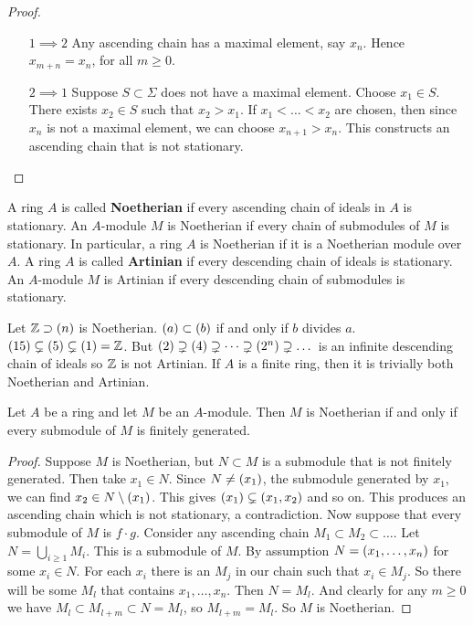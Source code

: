 \begin{proof}
\hfill
\begin{itemize}[leftmargin=0.5in]
\item[$ 1 \implies 2 $] Any ascending chain has a maximal element, say $ x_n $. Hence $ x_{m + n} = x_n $, for all $ m \ge 0 $.
\item[$ 2 \implies 1 $] Suppose $ S \subset \Sigma $ does not have a maximal element. Choose $ x_1 \in S $. There exists $ x_2 \in S $ such that $ x_2 > x_1 $. If $ x_1 < \dots < x_2 $ are chosen, then since $ x_n $ is not a maximal element, we can choose $ x_{n + 1} > x_n $. This constructs an ascending chain that is not stationary.
\end{itemize}
\end{proof}

\begin{definition}
A ring $ A $ is called \textbf{Noetherian} if every ascending chain of ideals in $ A $ is stationary. An $ A $-module $ M $ is Noetherian if every chain of submodules of $ M $ is stationary. In particular, a ring $ A $ is Noetherian if it is a Noetherian module over $ A $. A ring $ A $ is called \textbf{Artinian} if every descending chain of ideals is stationary. An $ A $-module $ M $ is Artinian if every descending chain of submodules is stationary.
\end{definition}

\begin{example*}
Let $ \mathbb{Z} \supset \left( n \right) $ is Noetherian. $ \left( a \right) \subset \left( b \right) $ if and only if $ b $ divides $ a $. $ \left( 15 \right) \subsetneq \left( 5 \right) \subsetneq \left( 1 \right) = \mathbb{Z} $. But $ \left( 2 \right) \supsetneq \left( 4 \right) \supsetneq \dots \supsetneq \left( 2^n \right) \supsetneq \dots $ is an infinite descending chain of ideals so $ \mathbb{Z} $ is not Artinian. If $ A $ is a finite ring, then it is trivially both Noetherian and Artinian.
\end{example*}

\begin{proposition}
Let $ A $ be a ring and let $ M $ be an $ A $-module. Then $ M $ is Noetherian if and only if every submodule of $ M $ is finitely generated.
\end{proposition}

\begin{proof}
Suppose $ M $ is Noetherian, but $ N \subset M $ is a submodule that is not finitely generated. Then take $ x_1 \in N $. Since $ N \ne \left( x_1 \right) $, the submodule generated by $ x_1 $, we can find $ x_2 \in N \setminus \left( x_1 \right) $. This gives $ \left( x_1 \right) \subsetneq \left( x_1, x_2 \right) $ and so on. This produces an ascending chain which is not stationary, a contradiction. Now suppose that every submodule of $ M $ is $ f \cdot g $. Consider any ascending chain $ M_1 \subset M_2 \subset \dots $. Let $ N = \bigcup_{i \ge 1} M_i $. This is a submodule of $ M $. By assumption $ N = \left( x_1, \dots, x_n \right) $ for some $ x_i \in N $. For each $ x_i $ there is an $ M_j $ in our chain such that $ x_i \in M_j $. So there will be some $ M_l $ that contains $ x_1, \dots, x_n $. Then $ N = M_l $. And clearly for any $ m \ge 0 $ we have $ M_l \subset M_{l + m} \subset N = M_l $, so $ M_{l + m} = M_l $. So $ M $ is Noetherian.
\end{proof}

